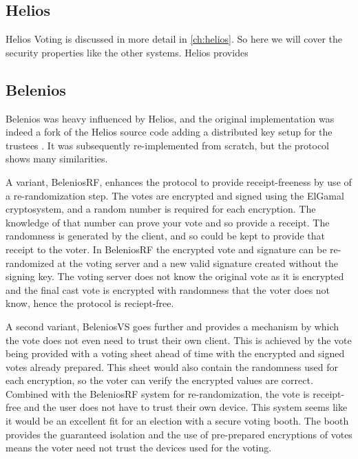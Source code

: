 

\subsection{Helios}

Helios Voting \cite{HeliosVotingFAQ} is discussed in more detail in \autoref{ch:helios}. So here we will cover the security properties like the other systems. Helios provides 

\subsection{Belenios}

Belenios was heavy influenced by Helios, and the original implementation was indeed a fork of the Helios source code adding a distributed key setup for the trustees \cite{cortierBeleniosSimplePrivate2019}. It was subsequently re-implemented from scratch, but the protocol shows many similarities.

A variant, BeleniosRF, enhances the protocol to provide receipt-freeness by use of a re-randomization step. The votes are encrypted and signed using the ElGamal cryptosystem, and a random number is required for each encryption. The knowledge of that number can prove your vote and so provide a receipt. The randomness is generated by the client, and so could be kept to provide that receipt to the voter. In BeleniosRF the encrypted vote and signature can be re-randomized at the voting server and a new valid signature created without the signing key. The voting server does not know the original vote as it is encrypted and the final cast vote is encrypted with randomness that the voter does not know, hence the protocol is reciept-free.

A second variant, BeleniosVS goes further and provides a mechanism by which the vote does not even need to trust their own client. This is achieved by the vote being provided with a voting sheet ahead of time with the encrypted and signed votes already prepared. This sheet would also contain the randomness used for each encryption, so the voter can verify the encrypted values are correct. Combined with the BeleniosRF system for re-randomization, the vote is receipt-free and the user does not have to trust their own device. This system seems like it would be an excellent fit for an election with a secure voting booth. The booth provides the guaranteed isolation and the use of pre-prepared encryptions of votes means the voter need not trust the devices used for the voting.

